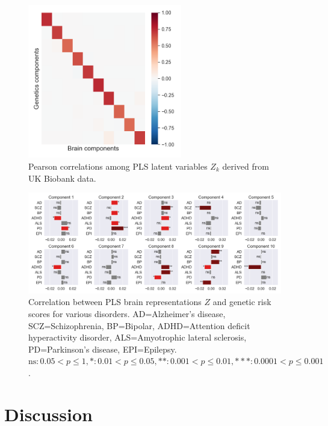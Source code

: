 \begin{figure}
    \centering
    \includegraphics[width=0.6\textwidth,trim={0.8cm 0cm 0.3cm 0cm}]{figures/UKBB/cross_corr.png}
    \caption{Pearson correlations among PLS latent variables \( Z_k \) derived from UK Biobank data.}
    \label{fig:UKBB_corr}
\end{figure}

\begin{figure}
    \centering
    \includegraphics[width=0.99\textwidth,trim={0.5cm 0cm 0.7cm 0cm}]{figures/UKBB/prs_correlations.png}
    \caption{Correlation between PLS brain representations \( Z \) and genetic risk scores for various disorders. AD=Alzheimer's disease, SCZ=Schizophrenia, BP=Bipolar, ADHD=Attention deficit hyperactivity disorder, ALS=Amyotrophic lateral sclerosis, PD=Parkinson's disease, EPI=Epilepsy. $\text{ns}: 0.05< p \leq 1, \ast: 0.01< p \leq 0.05, \ast\ast: 0.001< p \leq 0.01, \ast\ast\ast: 0.0001< p \leq 0.001$.}
    \label{fig:genetic_risk}
\end{figure}

\section{Discussion}

